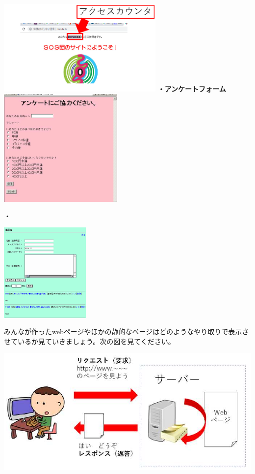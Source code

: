 \documentclass[a4paper,12pt,dvipdfmx]{jarticle}
\begin{document}
\centering
\includegraphics[width=8.176cm]{ome7-img046.png}
\textbf{・アンケートフォーム}\\
\includegraphics[width=6.1cm]{ome7-img047.png}
\flushleft


\bigskip

{\bfseries

	・}



\centering
\includegraphics[width=4.431cm]{ome7-img048.png}
\flushleft





\bigskip

みんなが作ったwebページやほかの静的なページはどのようなやり取りで表示させているか見ていきましょう。次の図を見てください。



\bigskip


\centering
\includegraphics[width=13.827cm]{ome7-img049}
\flushleft
\end{document}

